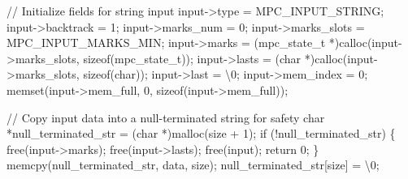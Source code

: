 \documentclass[
  a4paper,
]{scrreprt}
\newenvironment{Shaded}{\begin{snugshade}}{\end{snugshade}}
\newcommand{\CharTok}[1]{\textcolor[rgb]{0.00,0.50,0.00}{#1}}
\newcommand{\CommentTok}[1]{\textcolor[rgb]{0.41,0.41,0.41}{#1}}
\newcommand{\ControlFlowTok}[1]{\textcolor[rgb]{0.85,0.12,0.09}{#1}}
\newcommand{\DataTypeTok}[1]{\textcolor[rgb]{0.47,0.16,0.63}{#1}}
\newcommand{\DecValTok}[1]{\textcolor[rgb]{0.47,0.16,0.63}{#1}}
\newcommand{\KeywordTok}[1]{\textcolor[rgb]{0.85,0.12,0.09}{#1}}
\newcommand{\NormalTok}[1]{\textcolor[rgb]{0.33,0.33,0.33}{#1}}
\newcommand{\OperatorTok}[1]{\textcolor[rgb]{0.00,0.46,0.62}{#1}}
\newcommand{\SpecialCharTok}[1]{\textcolor[rgb]{0.00,0.46,0.62}{#1}}
\theoremstyle{definition}
\theoremstyle{remark}
\begin{document}
\begin{Shaded}
\begin{Highlighting}[numbers=left,,]
  \CommentTok{// Initialize fields for string input}
\NormalTok{  input}\OperatorTok{{-}\textgreater{}}\NormalTok{type }\OperatorTok{=}\NormalTok{ MPC\_INPUT\_STRING}\OperatorTok{;}
\NormalTok{  input}\OperatorTok{{-}\textgreater{}}\NormalTok{backtrack }\OperatorTok{=} \DecValTok{1}\OperatorTok{;}
\NormalTok{  input}\OperatorTok{{-}\textgreater{}}\NormalTok{marks\_num }\OperatorTok{=} \DecValTok{0}\OperatorTok{;}
\NormalTok{  input}\OperatorTok{{-}\textgreater{}}\NormalTok{marks\_slots }\OperatorTok{=}\NormalTok{ MPC\_INPUT\_MARKS\_MIN}\OperatorTok{;}
\NormalTok{  input}\OperatorTok{{-}\textgreater{}}\NormalTok{marks }\OperatorTok{=} \OperatorTok{(}\NormalTok{mpc\_state\_t }\OperatorTok{*)}\NormalTok{calloc}\OperatorTok{(}\NormalTok{input}\OperatorTok{{-}\textgreater{}}\NormalTok{marks\_slots}\OperatorTok{,} \KeywordTok{sizeof}\OperatorTok{(}\NormalTok{mpc\_state\_t}\OperatorTok{));}
\NormalTok{  input}\OperatorTok{{-}\textgreater{}}\NormalTok{lasts }\OperatorTok{=} \OperatorTok{(}\DataTypeTok{char} \OperatorTok{*)}\NormalTok{calloc}\OperatorTok{(}\NormalTok{input}\OperatorTok{{-}\textgreater{}}\NormalTok{marks\_slots}\OperatorTok{,} \KeywordTok{sizeof}\OperatorTok{(}\DataTypeTok{char}\OperatorTok{));}
\NormalTok{  input}\OperatorTok{{-}\textgreater{}}\NormalTok{last }\OperatorTok{=} \CharTok{\textquotesingle{}}\SpecialCharTok{\textbackslash{}0}\CharTok{\textquotesingle{}}\OperatorTok{;}
\NormalTok{  input}\OperatorTok{{-}\textgreater{}}\NormalTok{mem\_index }\OperatorTok{=} \DecValTok{0}\OperatorTok{;}
\NormalTok{  memset}\OperatorTok{(}\NormalTok{input}\OperatorTok{{-}\textgreater{}}\NormalTok{mem\_full}\OperatorTok{,} \DecValTok{0}\OperatorTok{,} \KeywordTok{sizeof}\OperatorTok{(}\NormalTok{input}\OperatorTok{{-}\textgreater{}}\NormalTok{mem\_full}\OperatorTok{));}

  \CommentTok{// Copy input data into a null{-}terminated string for safety}
  \DataTypeTok{char} \OperatorTok{*}\NormalTok{null\_terminated\_str }\OperatorTok{=} \OperatorTok{(}\DataTypeTok{char} \OperatorTok{*)}\NormalTok{malloc}\OperatorTok{(}\NormalTok{size }\OperatorTok{+} \DecValTok{1}\OperatorTok{);}
  \ControlFlowTok{if} \OperatorTok{(!}\NormalTok{null\_terminated\_str}\OperatorTok{)} \OperatorTok{\{}
\NormalTok{    free}\OperatorTok{(}\NormalTok{input}\OperatorTok{{-}\textgreater{}}\NormalTok{marks}\OperatorTok{);}
\NormalTok{    free}\OperatorTok{(}\NormalTok{input}\OperatorTok{{-}\textgreater{}}\NormalTok{lasts}\OperatorTok{);}
\NormalTok{    free}\OperatorTok{(}\NormalTok{input}\OperatorTok{);}
    \ControlFlowTok{return} \DecValTok{0}\OperatorTok{;}
  \OperatorTok{\}}
\NormalTok{  memcpy}\OperatorTok{(}\NormalTok{null\_terminated\_str}\OperatorTok{,}\NormalTok{ data}\OperatorTok{,}\NormalTok{ size}\OperatorTok{);}
\NormalTok{  null\_terminated\_str}\OperatorTok{[}\NormalTok{size}\OperatorTok{]} \OperatorTok{=} \CharTok{\textquotesingle{}}\SpecialCharTok{\textbackslash{}0}\CharTok{\textquotesingle{}}\OperatorTok{;}


\end{Highlighting}
\end{Shaded}
\end{document}
